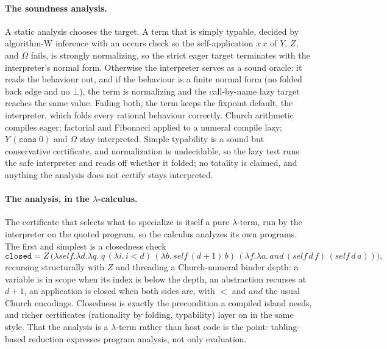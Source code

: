 \paragraph{The soundness analysis.}
A static analysis chooses the target. A term that is simply typable, decided by algorithm-W
inference with an occurs check so the self-application $x\,x$ of $Y$, $Z$, and $\Omega$ fails, is
strongly normalizing, so the strict eager target terminates with the interpreter's normal form.
Otherwise the interpreter serves as a sound oracle: it reads the behaviour out, and if the behaviour
is a finite normal form (no folded back edge and no $\bot$), the term is normalizing and the
call-by-name lazy target reaches the same value. Failing both, the term keeps the fixpoint default,
the interpreter, which folds every rational behaviour correctly. Church arithmetic compiles eager;
factorial and Fibonacci applied to a numeral compile lazy; $Y\,(\mathtt{cons}\;0)$ and $\Omega$ stay
interpreted. Simple typability is a sound but conservative certificate, and normalization is
undecidable, so the lazy test runs the safe interpreter and reads off whether it folded; no totality
is claimed, and anything the analysis does not certify stays interpreted.

\paragraph{The analysis, in the $\lambda$-calculus.}
The certificate that selects what to specialize is itself a pure $\lambda$-term, run by the
interpreter on the quoted program, so the calculus analyzes its own programs. The first and simplest
is a closedness check
\[
  \mathtt{closed} = Z\,\big(\lambda\mathit{self}.\lambda d.\lambda q.\;
    q\,(\lambda i.\, i < d)\,
    (\lambda b.\,\mathit{self}\,(d{+}1)\,b)\,
  (\lambda f.\lambda a.\,\mathit{and}\,(\mathit{self}\,d\,f)\,(\mathit{self}\,d\,a))\big),
\]
recursing structurally with $Z$ and threading a Church-numeral binder depth: a variable is in scope
when its index is below the depth, an abstraction recurses at $d+1$, an application is closed when
both sides are, with $<$ and $\mathit{and}$ the usual Church encodings. Closedness is exactly the
precondition a compiled island needs, and richer certificates (rationality by folding, typability)
layer on in the same style. That the analysis is a $\lambda$-term rather than host code is the point:
tabling-based reduction expresses program analysis, not only evaluation.

